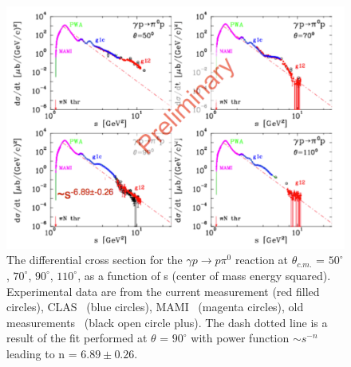 \documentclass{aip-cp}
\begin{document}
\begin{figure}[h]
	\centerline{\includegraphics[width=250 pt]{figures/pi0_scaling.pdf}}
	\caption{The differential cross section for the $\gamma p \to p \pi^0$ reaction at $\theta_{c.m.}$ = $50^{\circ}$, $70^{\circ}$, $90^{\circ}$, $110^{\circ}$, as a function of s (center of mass energy squared). Experimental data are from the current measurement (red filled circles), CLAS~\protect\cite{Dugger07,Dugger13} (blue circles), MAMI~\protect\cite{beck} (magenta circles), old measurements~\protect\cite{Joos} (black open circle plus). The dash dotted line is a result of the fit performed at $\theta$ = $90^{\circ}$ with power function $\sim s^{−n}$ leading to n = $6.89 \pm 0.26$.}
	\label{fig:pi0_scaling}
\end{figure}
\end{document}
